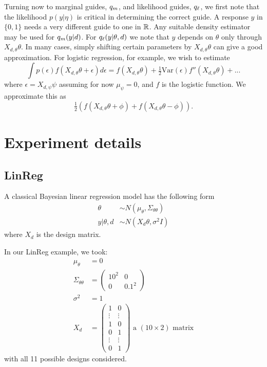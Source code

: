 Turning now to marginal guides, $q_m$, and likelihood guides, $q_\ell$, we first note that the likelihood $p(y|\eta)$ is critical in determining the correct guide. A response $y$ in $\{0, 1\}$ needs a very different guide to one in $\mathbb{R}$. Any suitable density estimator may be used for $q_m(y|d)$. For $q_\ell(y|\theta,d)$ we note that $y$ depends on $\theta$ only through $X_{d, \theta}\theta$. In many cases, simply shifting certain parameters by $X_{d, \theta}\theta$ can give a good approximation. For logistic regression, for example, we wish to estimate
\begin{equation}
	\int p(\epsilon) f(X_{d,\theta}\theta + \epsilon) d\epsilon = f(X_{d,\theta}\theta) + \tfrac{1}{2} \text{Var}(\epsilon)f''(X_{d,\theta}\theta) + ...
\end{equation}
where $\epsilon = X_{d,\psi}\psi$ assuming for now $\mu_\psi=0$, and $f$ is the logistic function. We approximate this as
\begin{equation}
	\tfrac{1}{2}\left(f(X_{d,\theta}\theta + \phi) + f(X_{d,\theta}\theta - \phi)\right).
\end{equation}



\section{Experiment details}
\label{sec:expdeets}

\subsection{LinReg}
A classical Bayesian linear regression model has the following form
\begin{align}
	\theta &\sim N(\mu_\theta, \Sigma_{\theta\theta}) \\
	y | \theta, d & \sim N(X_d\theta, \sigma^2 I)
\end{align}
where $X_d$ is the design matrix.

In our LinReg example, we took:
\begin{align}
	\mu_\theta &= 0 \\
	\Sigma_{\theta\theta} &= \begin{pmatrix}
		10^2 & 0 \\
		0 & 0.1^2
	\end{pmatrix} \\
	\sigma^2 &= 1 \\
	X_d &=
	\begin{pmatrix}
		1 & 0 \\
		\vdots & \vdots \\
		1 & 0 \\
		0 & 1 \\
		\vdots & \vdots \\
		0 & 1
	\end{pmatrix} \text{ a } (10 \times 2) \text{ matrix}
\end{align}
with all 11 possible designs considered.

